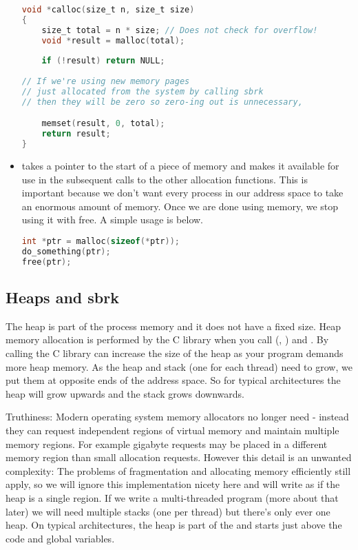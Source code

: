 \begin{itemize}
\begin{lstlisting}[language=C]
void *calloc(size_t n, size_t size)
{
    size_t total = n * size; // Does not check for overflow!
    void *result = malloc(total);
    
    if (!result) return NULL;
    
// If we're using new memory pages 
// just allocated from the system by calling sbrk
// then they will be zero so zero-ing out is unnecessary,

    memset(result, 0, total);
    return result; 
}
\end{lstlisting}

\item {} takes a pointer to the start of a piece of memory and makes it available for use in the subsequent calls to the other allocation functions. This is important because we don't want every process in our address space to take an enormous amount of memory. Once we are done using memory, we stop using it with free. A simple usage is below.

\begin{lstlisting}[language=C]
int *ptr = malloc(sizeof(*ptr));
do_something(ptr);
free(ptr);
\end{lstlisting}

\end{itemize}

\subsection{Heaps and sbrk}

The heap is part of the process memory and it does not have a fixed size. Heap memory allocation is performed by the C library when you call  (, ) and . By calling  the C library can increase the size of the heap as your program demands more heap memory. As the heap and stack (one for each thread) need to grow, we put them at opposite ends of the address space. So for typical architectures the heap will grow upwards and the stack grows downwards. 

Truthiness: Modern operating system memory allocators no longer need  - instead they can request independent regions of virtual memory and maintain multiple memory regions. For example gigabyte requests may be placed in a different memory region than small allocation requests. However this detail is an unwanted complexity: The problems of fragmentation and allocating memory efficiently still apply, so we will ignore this implementation nicety here and will write as if the heap is a single region. If we write a multi-threaded program (more about that later) we will need multiple stacks (one per thread) but there's only ever one heap. On typical architectures, the heap is part of the  and starts just above the code and global variables.

